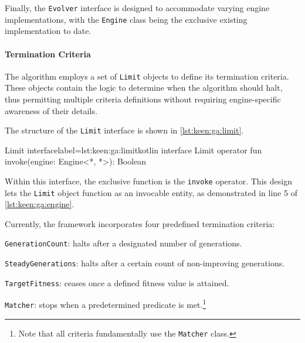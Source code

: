   Finally, the \texttt{Evolver} interface is designed to accommodate varying 
  engine implementations, with the \texttt{Engine} class being the exclusive 
  existing implementation to date.

  \paragraph{Termination Criteria}
    The algorithm employs a set of \texttt{Limit} objects to define its 
    termination criteria.
    These objects contain the logic to determine when the algorithm should halt, 
    thus permitting multiple criteria definitions without requiring 
    engine-specific awareness of their details.

    The structure of the \texttt{Limit} interface is shown in 
    \vref{lst:keen:ga:limit}.

    \begin{code}{Limit interface}{label={lst:keen:ga:limit}}{kotlin}      interface Limit {
          operator fun invoke(engine: Engine<*, *>): Boolean
      }
    \end{code}

    Within this interface, the exclusive function is the \texttt{invoke} 
    operator.
    This design lets the \texttt{Limit} object function as an invocable entity, 
    as demonstrated in line 5 of \vref{lst:keen:ga:engine}.

    Currently, the framework incorporates four predefined termination criteria:
    \begin{enumerate*}
      \item \texttt{GenerationCount}: halts after a designated number of 
        generations.
      \item \texttt{SteadyGenerations}: halts after a certain count of 
        non-improving generations.
      \item \texttt{TargetFitness}: ceases once a defined fitness value is 
        attained.
      \item \texttt{Matcher}: stops when a predetermined predicate is 
        met.\footnote{
          Note that all criteria fundamentally use the \texttt{Matcher} class.
        }
    \end{enumerate*}
